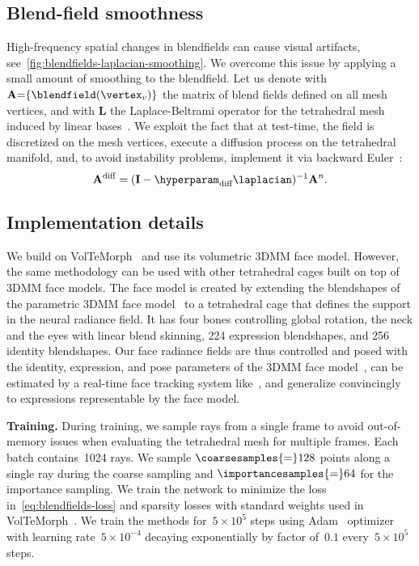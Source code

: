   \subsection{Blend-field smoothness}
    \label{sec:blendfields-smoothness}
    \newcommand{\blendfieldVertices}{\mathbf{A}}
    High-frequency spatial changes in blendfields can cause visual artifacts,
    see~\cref{fig:blendfields-laplacian-smoothing}.
    We overcome this issue by applying a small amount of smoothing to the
    blendfield.
    Let us denote with $\blendfieldVertices{=}\{\blendfield(\vertex_v)\}$ the
    matrix of blend fields defined on all mesh vertices, and with $\mathbf{L}$
    the Laplace-Beltrami operator for the tetrahedral mesh induced by linear
    bases~\cite{irving2004invertible}.
    We exploit the fact that at test-time, the field is discretized on the mesh vertices, execute a diffusion process on the tetrahedral manifold, and, to avoid instability problems, implement it via backward Euler~\cite{desbrun1999implicit}:
    \begin{equation}
      \blendfieldVertices^\text{diff} = (\mathbf{I} - \hyperparam_\text{diff} \laplacian)^{-1} \blendfieldVertices^n.
    \end{equation}

  \subsection{Implementation details}
    \label{sec:blendfields-implementation}
    We build on VolTeMorph~\cite{garbin2024voltemorph} and use its volumetric
    3DMM face model.
    However, the same methodology can be used with other tetrahedral cages
    built on top of 3DMM face models.
    The face model is created by extending the blendshapes of the parametric
    3DMM face model~\cite{fakeItTillYouMakeIt} to a tetrahedral cage that
    defines the support in the neural radiance field.
    It has four bones controlling global rotation, the neck and the eyes with
    linear blend skinning, 224 expression blendshapes, and 256 identity
    blendshapes.
    Our face radiance fields are thus controlled and posed with the identity,
    expression, and pose parameters of the 3DMM face
    model~\cite{fakeItTillYouMakeIt}, can be estimated by a real-time face
    tracking system like~\cite{wft}, and generalize convincingly to
    expressions representable by the face model.

    \noindent\textbf{Training.}
    During training, we sample rays from a single frame to avoid out-of-memory
    issues when evaluating the tetrahedral mesh for multiple frames.
    Each batch contains~1024 rays.
    We sample $\coarsesamples{=}128$ points along a single ray during the
    coarse sampling and $\importancesamples{=}64$ for the importance sampling.
    We train the network to minimize the loss in~\cref{eq:blendfields-loss}
    and sparsity losses with standard weights used in
    VolTeMorph~\cite{garbin2024voltemorph,hedman2021baking}.
    We train the methods for~$5{\times}10^5$ steps using
    Adam~\cite{kingma2014adam} optimizer with learning rate~$5{\times}10^{-4}$
    decaying exponentially by factor of~$0.1$ every~$5{\times}10^5$ steps.

